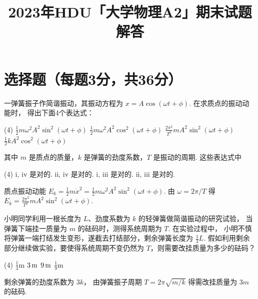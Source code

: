 \documentclass[quiet]{ctexart}
\title{\sffamily\bfseries 2023年HDU「大学物理A2」期末试题解答}
\author{} \date{}
\begin{document}
\maketitle

\section{选择题（每题3分，共36分）}

\begin{problem}
  一弹簧振子作简谐振动，其振动方程为 $x = A\cos(\omega t + \phi)$. 在求质点的振动动能时，
  得出下面4个表达式：
  \begin{tasks}[ label = \roman*. ](4)
    \task $\frac12 m\omega^2A^2 \sin^2(\omega t + \phi)$
    \task $\frac12 m\omega^2A^2 \cos^2(\omega t + \phi)$
    \task $\frac{2\pi^2}{T^2}mA^2 \sin^2(\omega t + \phi)$
    \task $\frac12kA^2 \cos^2(\omega t + \phi)$
  \end{tasks}
  其中 $m$ 是质点的质量，$k$ 是弹簧的劲度系数，$T$ 是振动的周期. 这些表达式中
  \begin{tasks}(4)
    \task i, iv 是对的.
    \task ii, iv 是对的.
    \task[\true] i, iii 是对的.
    \task ii, iii 是对的.
  \end{tasks}
\end{problem}
\begin{solution}
  质点振动动能
  $E_k = \frac12 m \dot x^2 = \frac12 m\omega^2A^2\sin^2(\omega t + \phi)$.
  由 $\omega = 2\pi/T$ 得 $E_k = \frac{2\pi^2}{T^2}mA^2\sin^2(\omega t + \phi)$.
\end{solution}

\begin{problem}
  小明同学利用一根长度为 $L$、劲度系数为 $k$ 的轻弹簧做简谐振动的研究试验，
  当弹簧下端挂一质量为 $m$ 的砝码时，测得系统周期为 $T$. 在实验过程中，
  小明不慎将弹簧一端打结发生变形，遂截去打结部分，剩余弹簧长度为 $\frac13L$.
  假如利用剩余部分继续做实验，要使得系统周期不变仍然为 $T$，则需要改挂质量为多少的砝码？
  \begin{tasks}(4)
    \task $\frac13\unit\m$
    \task[\true] $\qty3\m$
    \task $\qty9\m$
    \task $\frac19\unit\m$
  \end{tasks}
\end{problem}
\begin{solution}
  剩余弹簧的劲度系数为 $3k$，
  由弹簧振子周期 $T = 2\pi\sqrt{m/k}$ 得需改挂质量为 $3m$ 的砝码.
\end{solution}
\end{document}
